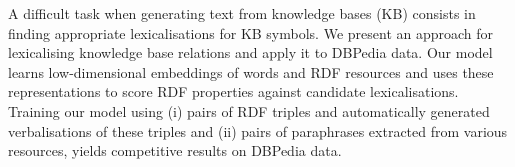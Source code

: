 A difficult task when generating text from  knowledge bases (KB) consists in finding appropriate lexicalisations for KB symbols. We present an approach for lexicalising knowledge base relations and apply it to DBPedia data. Our model learns low-dimensional embeddings of words and RDF resources and uses these representations to score RDF properties against candidate lexicalisations. Training our model using (i) pairs of RDF triples and automatically generated verbalisations of these triples and (ii) pairs of paraphrases extracted from various resources, yields competitive results on DBPedia data.
